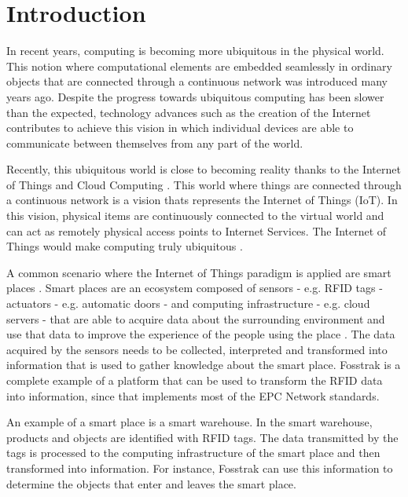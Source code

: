 \section{Introduction}
\label{sec:introduction}
In recent years, computing is becoming more ubiquitous in the physical world. This
notion where computational elements are embedded seamlessly in ordinary objects that
are connected through a continuous network was introduced many years ago\cite{weiser1991computer}.
Despite the progress towards ubiquitous computing has been slower than the expected,
technology advances such as the creation of the Internet contributes to achieve this vision in
which individual devices are able to communicate between themselves from any part of the
world\cite{gubbi2013internet}.

Recently, this ubiquitous world is close to becoming reality thanks to the Internet of Things
and Cloud Computing \cite{caceres2012ubicomp}. This world where things are connected
through a continuous network is a vision thats represents the Internet of Things (IoT).
In this vision, physical items are continuously connected to the virtual world and can
act as remotely physical access points to Internet Services. The Internet of Things would
make computing truly ubiquitous \cite{mattern2010internet}.

A common scenario where the Internet of Things paradigm is applied are smart places \cite{atzori2010internet}.
Smart places are an ecosystem composed of sensors - e.g. RFID tags - actuators - e.g. automatic doors -
and computing infrastructure - e.g. cloud servers - that are able to acquire data about the surrounding
environment and use that data to improve the experience of the people using the place \cite{cook2004smart}.
The data acquired by the sensors needs to be collected, interpreted and transformed into information that
is used to gather knowledge about the smart place. Fosstrak is a complete example of a platform that
can be used to transform the RFID data into information, since that implements most of the EPC Network
standards.

An example of a smart place is a smart warehouse. In the smart warehouse, products and objects
are identified with RFID tags. The data transmitted by the tags is processed to the computing
infrastructure of the smart place and then transformed into information. For instance,
Fosstrak can use this information to determine the objects that enter and leaves the smart place.


